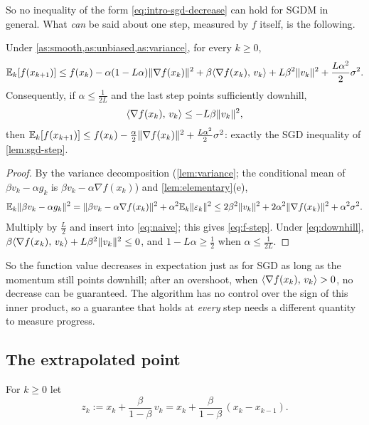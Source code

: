 So no inequality of the form \eqref{eq:intro-sgd-decrease} can hold for SGDM in general.
What \emph{can} be said about one step, measured by $f$ itself, is the following.

\begin{proposition}\label{prop:f-step}
Under \cref{as:smooth,as:unbiased,as:variance}, for every $k\ge0$,
\begin{equation}\label{eq:f-step}
  \mathbb{E}_k[f(x_{k+1})]\le f(x_k)-\alpha(1-L\alpha)\lVert \nabla f(x_k)\rVert^2
  +\beta\langle \nabla f(x_k),\, v_k\rangle+L\beta^2\lVert v_k\rVert^2+\frac{L\alpha^2}{2}\sigma^2 .
\end{equation}
Consequently, if $\alpha\le\frac1{2L}$ and the last step points sufficiently downhill,
\begin{equation}\label{eq:downhill}
  \langle \nabla f(x_k),\, v_k\rangle\le-L\beta\lVert v_k\rVert^2,
\end{equation}
then $\mathbb{E}_k[f(x_{k+1})]\le f(x_k)-\frac\alpha2\lVert \nabla f(x_k)\rVert^2+\frac{L\alpha^2}{2}\sigma^2$:
exactly the SGD inequality of \cref{lem:sgd-step}.
\end{proposition}

\begin{proof}
By the variance decomposition (\cref{lem:variance}; the conditional mean of
$\beta v_k-\alpha g_k$ is $\beta v_k-\alpha\nabla f(x_k)$) and \cref{lem:elementary}(e),
\[
  \mathbb{E}_k\lVert \beta v_k-\alpha g_k\rVert^2=\lVert \beta v_k-\alpha\nabla f(x_k)\rVert^2+\alpha^2\mathbb{E}_k\lVert \varepsilon_k\rVert^2
  \le2\beta^2\lVert v_k\rVert^2+2\alpha^2\lVert \nabla f(x_k)\rVert^2+\alpha^2\sigma^2 .
\]
Multiply by $\frac L2$ and insert into \eqref{eq:naive}; this gives \eqref{eq:f-step}. Under
\eqref{eq:downhill}, $\beta\langle \nabla f(x_k),\, v_k\rangle+L\beta^2\lVert v_k\rVert^2\le0$, and
$1-L\alpha\ge\frac12$ when $\alpha\le\frac1{2L}$.
\end{proof}

So the function value decreases in expectation just as for SGD as long as the momentum
still points downhill; after an overshoot, when $\langle \nabla f(x_k),\, v_k\rangle>0$, no decrease can
be guaranteed. The algorithm has no control over the sign of this inner product, so a
guarantee that holds at \emph{every} step needs a different quantity to measure progress.

\subsection{The extrapolated point}\label{sec:extrapolated}

\begin{definition}
For $k\ge0$ let
\begin{equation}\label{eq:z}
  z_k:=x_k+\frac{\beta}{1-\beta}\,v_k=x_k+\frac{\beta}{1-\beta}\,(x_k-x_{k-1}).
\end{equation}
\end{definition}

